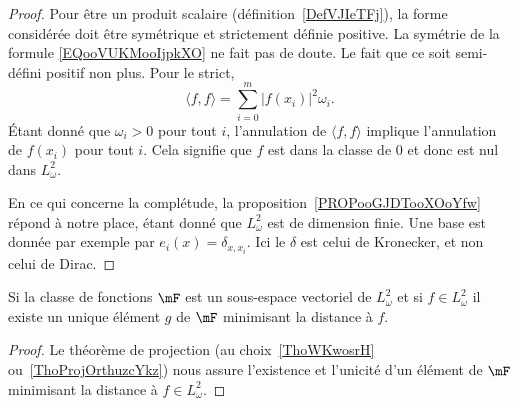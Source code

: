 \begin{proof}
    Pour être un produit scalaire (définition~\ref{DefVJIeTFj}), la forme considérée doit être symétrique et strictement définie positive. La symétrie de la formule \eqref{EQooVUKMooIjpkXO} ne fait pas de doute. Le fait que ce soit semi-défini positif non plus. Pour le strict,
    \begin{equation}
        \langle f, f\rangle =\sum_{i=0}^m| f(x_i) |^2\omega_i.
    \end{equation}
    Étant donné que \( \omega_i>0\) pour tout \( i\), l'annulation de \( \langle f, f\rangle \) implique l'annulation de \( f(x_i)\) pour tout \( i\). Cela signifie que \( f\) est dans la classe de \( 0\) et donc est nul dans \( L^2_{\omega}\).

    En ce qui concerne la complétude, la proposition~\ref{PROPooGJDTooXOoYfw} répond à notre place, étant donné que \( L^2_{\omega}\) est de dimension finie. Une base est donnée par exemple par \( e_i(x)=\delta_{x,x_{i}}\). Ici le \( \delta\) est celui de Kronecker, et non celui de Dirac.
\end{proof}

\begin{lemma}
    Si la classe de fonctions \( \mF\) est un sous-espace vectoriel de \( L^2_{\omega}\) et si \( f\in L^2_{\omega}\) il existe un unique élément \( g\) de \( \mF\) minimisant la distance à \( f\).
\end{lemma}

\begin{proof}
    Le théorème de projection (au choix~\ref{ThoWKwosrH} ou~\ref{ThoProjOrthuzcYkz}) nous assure l'existence et l'unicité d'un élément de \( \mF\) minimisant la distance à \( f\in L^2_{\omega}\).
\end{proof}

